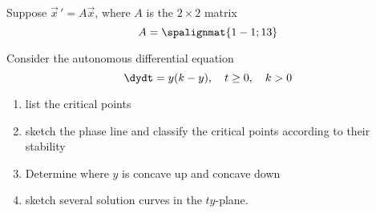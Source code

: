 \documentclass[11pt]{exam}
\begin{document}
\begin{questions}
    
    
\newpage \InitialsLeft

    \question[10] %
    Suppose $\vec x \, ' = A \vec x$, where $A$ is the $2\times 2$ matrix 
    $$A = \spalignmat{1 -1;1 3}$$
    

    

    
\newpage \InitialsRight

    \question[10] Consider the autonomous differential equation 
    $$\dydt = y(k - y), \quad t \ge 0, \quad k  > 0$$  %
    \begin{enumerate}[label=(\roman*)]
        \item list the critical points \vspace{1cm}
        \item sketch the phase line and classify the critical points according to their stability \vspace{4cm}
        \item Determine where $y$ is concave up and concave down \vspace{6cm}
        \item sketch several solution curves in the $ty$-plane. 
    \end{enumerate}

\newpage \InitialsLeft

    \question[10] 
    
    

\end{questions}
\end{document}
